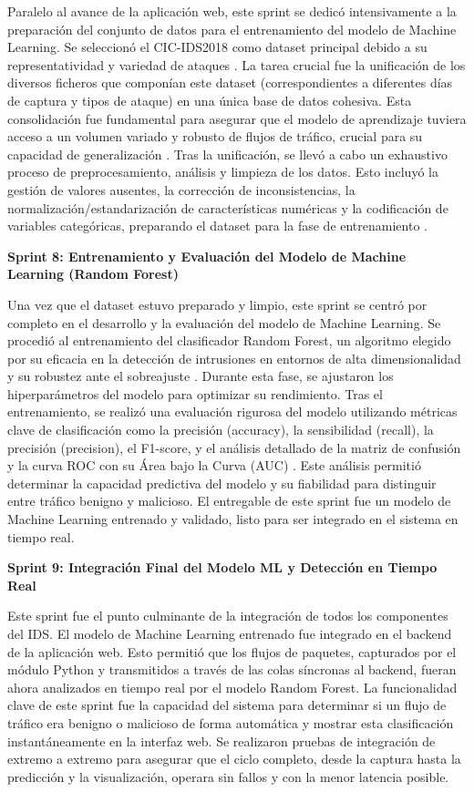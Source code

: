 Paralelo al avance de la aplicación web, este sprint se dedicó intensivamente a la preparación del conjunto de datos para el entrenamiento del modelo de Machine Learning. Se seleccionó el CIC-IDS2018 como dataset principal debido a su representatividad y variedad de ataques \cite{PolaniaArias2021EvaluacionMLIDS}. La tarea crucial fue la unificación de los diversos ficheros que componían este dataset (correspondientes a diferentes días de captura y tipos de ataque) en una única base de datos cohesiva. Esta consolidación fue fundamental para asegurar que el modelo de aprendizaje tuviera acceso a un volumen variado y robusto de flujos de tráfico, crucial para su capacidad de generalización \cite{PolaniaArias2021EvaluacionMLIDS}. Tras la unificación, se llevó a cabo un exhaustivo proceso de preprocesamiento, análisis y limpieza de los datos. Esto incluyó la gestión de valores ausentes, la corrección de inconsistencias, la normalización/estandarización de características numéricas y la codificación de variables categóricas, preparando el dataset para la fase de entrenamiento \cite{James2013ISLR}.

\textbf{Sprint 8: Entrenamiento y Evaluación del Modelo de Machine Learning (Random Forest)}

Una vez que el dataset estuvo preparado y limpio, este sprint se centró por completo en el desarrollo y la evaluación del modelo de Machine Learning. Se procedió al entrenamiento del clasificador Random Forest, un algoritmo elegido por su eficacia en la detección de intrusiones en entornos de alta dimensionalidad y su robustez ante el sobreajuste \cite{Breiman2001RandomForests}. Durante esta fase, se ajustaron los hiperparámetros del modelo para optimizar su rendimiento. Tras el entrenamiento, se realizó una evaluación rigurosa del modelo utilizando métricas clave de clasificación como la precisión (accuracy), la sensibilidad (recall), la precisión (precision), el F1-score, y el análisis detallado de la matriz de confusión y la curva ROC con su Área bajo la Curva (AUC) \cite{PolaniaArias2021EvaluacionMLIDS}. Este análisis permitió determinar la capacidad predictiva del modelo y su fiabilidad para distinguir entre tráfico benigno y malicioso. El entregable de este sprint fue un modelo de Machine Learning entrenado y validado, listo para ser integrado en el sistema en tiempo real.

\textbf{Sprint 9: Integración Final del Modelo ML y Detección en Tiempo Real}

Este sprint fue el punto culminante de la integración de todos los componentes del IDS. El modelo de Machine Learning entrenado fue integrado en el backend de la aplicación web. Esto permitió que los flujos de paquetes, capturados por el módulo Python y transmitidos a través de las colas síncronas al backend, fueran ahora analizados en tiempo real por el modelo Random Forest. La funcionalidad clave de este sprint fue la capacidad del sistema para determinar si un flujo de tráfico era benigno o malicioso de forma automática y mostrar esta clasificación instantáneamente en la interfaz web. Se realizaron pruebas de integración de extremo a extremo para asegurar que el ciclo completo, desde la captura hasta la predicción y la visualización, operara sin fallos y con la menor latencia posible.

